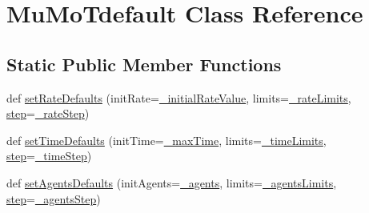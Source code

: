 \hypertarget{class_mu_mo_t_1_1_mu_mo_t_1_1_mu_mo_tdefault}{}\section{Mu\+Mo\+Tdefault Class Reference}
\label{class_mu_mo_t_1_1_mu_mo_t_1_1_mu_mo_tdefault}
\subsection*{Static Public Member Functions}
\begin{DoxyCompactItemize}
\item 
def \hyperlink{class_mu_mo_t_1_1_mu_mo_t_1_1_mu_mo_tdefault_a3ce665e68925e7c173896a5101b16dfa}{set\+Rate\+Defaults} (init\+Rate=\hyperlink{class_mu_mo_t_1_1_mu_mo_t_1_1_mu_mo_tdefault_adbfda01292fc4c7936ed57523fd625c7}{\+\_\+initial\+Rate\+Value}, limits=\hyperlink{class_mu_mo_t_1_1_mu_mo_t_1_1_mu_mo_tdefault_a89f788e3d778e1e0554c57832275d484}{\+\_\+rate\+Limits}, \hyperlink{namespace_mu_mo_t_1_1_mu_mo_t_ae5f3bfeb7e3cb5c8bc769d5504ebeeae}{step}=\hyperlink{class_mu_mo_t_1_1_mu_mo_t_1_1_mu_mo_tdefault_aa45ec6be070d9881c9c018a533f6573c}{\+\_\+rate\+Step})
\item 
def \hyperlink{class_mu_mo_t_1_1_mu_mo_t_1_1_mu_mo_tdefault_a4be4721ce31fd644cb66ae8af0dd41fe}{set\+Time\+Defaults} (init\+Time=\hyperlink{class_mu_mo_t_1_1_mu_mo_t_1_1_mu_mo_tdefault_a46ffe9aa10cdab976a57d8ba1d3cd2f6}{\+\_\+max\+Time}, limits=\hyperlink{class_mu_mo_t_1_1_mu_mo_t_1_1_mu_mo_tdefault_a2208809031da7f126f4416fb64cdb026}{\+\_\+time\+Limits}, \hyperlink{namespace_mu_mo_t_1_1_mu_mo_t_ae5f3bfeb7e3cb5c8bc769d5504ebeeae}{step}=\hyperlink{class_mu_mo_t_1_1_mu_mo_t_1_1_mu_mo_tdefault_ad83203bcc6032b30e6f5b57f8982af9e}{\+\_\+time\+Step})
\item 
def \hyperlink{class_mu_mo_t_1_1_mu_mo_t_1_1_mu_mo_tdefault_a390063ec9e63f433bf06fa72f608b7e4}{set\+Agents\+Defaults} (init\+Agents=\hyperlink{class_mu_mo_t_1_1_mu_mo_t_1_1_mu_mo_tdefault_a42f05ec35f2b5b564e064bb19ebd36cf}{\+\_\+agents}, limits=\hyperlink{class_mu_mo_t_1_1_mu_mo_t_1_1_mu_mo_tdefault_a01360abcb6eddb212c38b66852c35e17}{\+\_\+agents\+Limits}, \hyperlink{namespace_mu_mo_t_1_1_mu_mo_t_ae5f3bfeb7e3cb5c8bc769d5504ebeeae}{step}=\hyperlink{class_mu_mo_t_1_1_mu_mo_t_1_1_mu_mo_tdefault_a55b7c54066a90600796a35e96ef5743b}{\+\_\+agents\+Step})
\end{DoxyCompactItemize}
